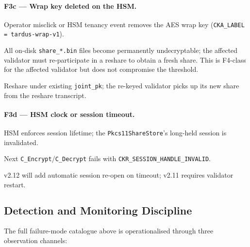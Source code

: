 \paragraph{F3c --- Wrap key deleted on the HSM.}
\begin{description}[leftmargin=2em,style=nextline,itemsep=0pt]
  \item[Trigger] Operator misclick or HSM tenancy event removes the
    AES wrap key (\texttt{CKA\_LABEL = tardus-wrap-v1}).
  \item[Consequence] All on-disk \texttt{share\_*.bin} files become
    permanently undecryptable; the affected validator must
    re-participate in a reshare to obtain a fresh share. This is
    F4-class for the affected validator but does not compromise the
    threshold.
  \item[Recovery] Reshare under existing \texttt{joint\_pk}; the
    re-keyed validator picks up its new share from the reshare
    transcript.
\end{description}

\paragraph{F3d --- HSM clock or session timeout.}
\begin{description}[leftmargin=2em,style=nextline,itemsep=0pt]
  \item[Trigger] HSM enforces session lifetime; the
    \texttt{Pkcs11ShareStore}'s long-held session is invalidated.
  \item[Consequence] Next \texttt{C\_Encrypt}/\texttt{C\_Decrypt}
    fails with \texttt{CKR\_SESSION\_HANDLE\_INVALID}.
  \item[Recovery] v2.12 will add automatic session re-open on
    timeout; v2.11 requires validator restart.
\end{description}

\subsection{Detection and Monitoring Discipline}
\label{sec:failure-monitoring}

The full failure-mode catalogue above is operationalised through three
observation channels:

